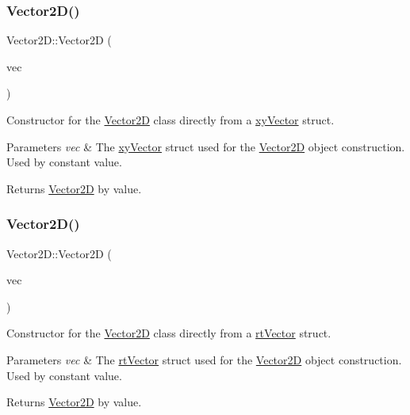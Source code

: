 \subsubsection{\texorpdfstring{Vector2\+D()}{Vector2D()}\hspace{0.1cm}{\footnotesize\ttfamily [3/5]}}
{\footnotesize\ttfamily Vector2\+D\+::\+Vector2D (\begin{DoxyParamCaption}\item[{const \hyperlink{structxy_vector}{xy\+Vector}}]{vec }\end{DoxyParamCaption})}



Constructor for the \hyperlink{class_vector2_d}{Vector2D} class directly from a \hyperlink{structxy_vector}{xy\+Vector} struct. 


\begin{DoxyParams}{Parameters}
{\em vec} & The \hyperlink{structxy_vector}{xy\+Vector} struct used for the \hyperlink{class_vector2_d}{Vector2D} object construction. Used by constant value. \\
\hline
\end{DoxyParams}
\begin{DoxyReturn}{Returns}
\hyperlink{class_vector2_d}{Vector2D} by value. 
\end{DoxyReturn}
\mbox{\label{class_vector2_d_a3253f7c676f03f9d460d6b473934a1ff}} 
\subsubsection{\texorpdfstring{Vector2\+D()}{Vector2D()}\hspace{0.1cm}{\footnotesize\ttfamily [4/5]}}
{\footnotesize\ttfamily Vector2\+D\+::\+Vector2D (\begin{DoxyParamCaption}\item[{const \hyperlink{structrt_vector}{rt\+Vector}}]{vec }\end{DoxyParamCaption})}



Constructor for the \hyperlink{class_vector2_d}{Vector2D} class directly from a \hyperlink{structrt_vector}{rt\+Vector} struct. 


\begin{DoxyParams}{Parameters}
{\em vec} & The \hyperlink{structrt_vector}{rt\+Vector} struct used for the \hyperlink{class_vector2_d}{Vector2D} object construction. Used by constant value. \\
\hline
\end{DoxyParams}
\begin{DoxyReturn}{Returns}
\hyperlink{class_vector2_d}{Vector2D} by value. 
\end{DoxyReturn}
\mbox{\label{class_vector2_d_a658f4dd52408392ab5ad5fb36112a5c8}} 
